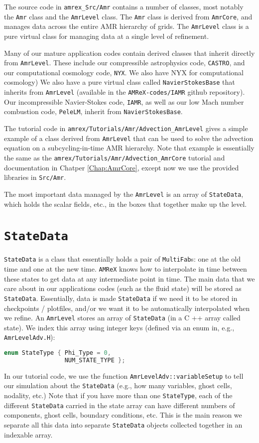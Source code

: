 The source code in {\tt amrex\_Src/Amr} contains a number of classes, most notably
the {\tt Amr} class and the {\tt AmrLevel} class.
The {\tt Amr} class is derived from {\tt AmrCore}, and manages data across the 
entire AMR hierarchy of grids.
The {\tt AmrLevel} class is a pure virtual class for managing data at a
single level of refinement.

Many of our mature application codes contain derived classes that inherit directly
from {\tt AmrLevel}.  These include our compressible astrophysics code,
{\tt CASTRO}, and our computational cosmology code, {\tt NYX}.  We also have
NYX for computational cosmology)   We also have 
a pure virtual class called {\tt NavierStokesBase} that inherits from {\tt AmrLevel}
(available in the {\tt AMReX-codes/IAMR} github repository).  Our incompressible
Navier-Stokes code, {\tt IAMR}, as well as our low Mach number combustion code,
{\tt PeleLM}, inherit from {\tt NavierStokesBase}.

The tutorial code in {\tt amrex/Tutorials/Amr/Advection\_AmrLevel} gives a simple
example of a class derived from {\tt AmrLevel} that can be used to solve
the advection equation on a subcycling-in-time AMR hierarchy.  Note that example
is essentially the same as the {\tt amrex/Tutorials/Amr/Advection\_AmrCore} tutorial
and documentation in Chatper \ref{Chap:AmrCore}, except now we use the provided
libraries in {\tt Src/Amr}.

The most important data managed by the {\tt AmrLevel} is an array of {\tt StateData},
which holds the scalar fields, etc., in the boxes that together make up the level.

\section{{\tt StateData}}
{\tt StateData} is a class that essentially holds a pair of {\tt MultiFab}s: one at the old time and one
at the new time. {\tt AMReX} knows how to interpolate in time between these states to get data at
any intermediate point in time. The main data that we care about in our applications codes 
(such as the fluid state) will be stored as {\tt StateData}. Essentially, data is made {\tt StateData}
if we need it to be stored in checkpoints / plotfiles, and/or we want it to be automatically
interpolated when we refine.
An {\tt AmrLevel} stores an array of {\tt StateData} (in a C ++ array called state). We index this array
using integer keys (defined via an enum in, e.g., {\tt AmrLevelAdv.H}):
\begin{lstlisting}[language=cpp]
enum StateType { Phi_Type = 0,
                 NUM_STATE_TYPE };
\end{lstlisting}
In our tutorial code, we use the function {\tt AmrLevelAdv::variableSetup} to tell our simulation about
the {\tt StateData} (e.g., how many variables, ghost cells, nodality, etc.)
Note that if you have more than one {\tt StateType}, each of the different {\tt StateData} 
carried in the state array can have different numbers
of components, ghost cells, boundary conditions, etc. This is the main reason we separate all this
data into separate {\tt StateData} objects collected together in an indexable array.
